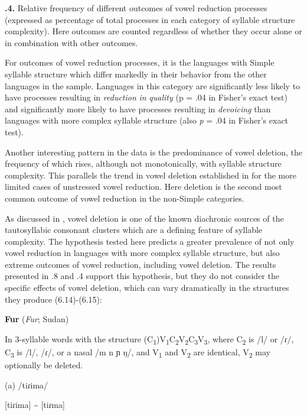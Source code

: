 \textbf{.4.} Relative frequency of different outcomes of vowel reduction processes (expressed as percentage of total processes in each category of syllable structure complexity). Here outcomes are counted regardless of whether they occur alone or in combination with other outcomes.

  For outcomes of vowel reduction processes, it is the languages with Simple syllable structure which differ markedly in their behavior from the other languages in the sample. Languages in this category are significantly less likely to have processes resulting in \textit{reduction} \textit{in} \textit{quality} (p = .04 in Fisher’s exact test) and significantly more likely to have processes resulting in \textit{devoicing} than languages with more complex syllable structure (also \textit{p} = .04 in Fisher’s exact test).

  Another interesting pattern in the data is the predominance of vowel deletion, the frequency of which rises, although not monotonically, with syllable structure complexity. This parallels the trend in vowel deletion established in  for the more limited cases of unstressed vowel reduction. Here deletion is the second most common outcome of vowel reduction in the non-Simple categories. 

  As discussed in , vowel deletion is one of the known diachronic sources of the tautosyllabic consonant clusters which are a defining feature of syllable complexity. The hypothesis tested here predicts a greater prevalence of not only vowel reduction in languages with more complex syllable structure, but also extreme outcomes of vowel reduction, including vowel deletion. The results presented in .8 and .4 support this hypothesis, but they do not consider the specific effects of vowel deletion, which can vary dramatically in the structures they produce (6.14)-(6.15):

\ea\label{ex:(6.14)}
   \textbf{Fur} (\textit{Fur}; Sudan)

  In 3-syllable words with the structure (C\textsubscript{1})V\textsubscript{1}C\textsubscript{2}V\textsubscript{2}C\textsubscript{3}V\textsubscript{3}, where C\textsubscript{2} is /l/ or /ɾ/, C\textsubscript{3} is /l/, /ɾ/, or a nasal /m n ɲ ŋ/, and V\textsubscript{1} and V\textsubscript{2} are identical, V\textsubscript{2} may optionally be deleted.

(a)  /tiɾima/

[tiɾima] {\textasciitilde} [tiɾma]

